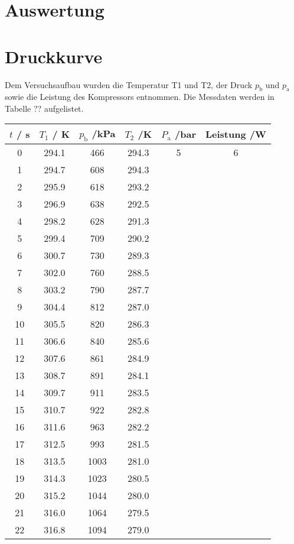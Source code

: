 \section{Auswertung}
\label{sec:Auswertung}
\section{Druckkurve}
Dem Versuchsaufbau wurden die Temperatur T1 und T2, der Druck $p_{\text{b}}$ und $p_{\text{a}}$ sowie die Leistung des Kompressors entnommen. Die Messdaten werden in Tabelle ?? aufgelistet.
\begin{table}
  \centering
  \begin{tabular}{c c c c c c}
    \toprule
    $t$ / s & $T_{\text{1}}$ / K & $p_{\text{b}}$ /kPa & $T_{2}$ /K & $P_{\text{a}}$ /bar & 
    Leistung /W \\
    \midrule
    0 	& 294.1 & 466	& 294.3	&5	&6 \\
    1 	& 294.7 & 608	& 294.3	&	&	\\
    2 	& 295.9 & 618	& 293.2	&	&	\\
    3 	& 296.9 & 638	& 292.5	&	&	\\
    4	& 298.2	& 628	& 291.3	&	&	\\
    5	& 299.4 & 709	& 290.2	&	&	\\
    6	& 300.7 & 730	& 289.3	&	&	\\
    7	& 302.0 & 760	& 288.5	&	&	\\
    8	& 303.2	& 790	& 287.7	&	&	\\
    9	& 304.4 & 812	& 287.0	&	&	\\
    10	& 305.5 & 820	& 286.3	&	&	\\
    11 	& 306.6 & 840	& 285.6	&	&	\\
    12	& 307.6	& 861	& 284.9	&	&	\\	
    13	& 308.7 & 891	& 284.1	&	&	\\	
    14 	& 309.7 & 911	& 283.5	&	&	\\
    15 	& 310.7 & 922	& 282.8	&	&	\\
    16 	& 311.6	& 963	& 282.2	&	&	\\
    17	& 312.5	& 993	& 281.5	&	&	\\
    18	& 313.5	& 1003	& 281.0	&	&	\\
    19	& 314.3	& 1023	& 280.5	&	&	\\
    20	& 315.2	& 1044	& 280.0	&	&	\\
    21	& 316.0	& 1064	& 279.5	&	&	\\
    22	& 316.8	& 1094	& 279.0	&	&	\\

\end{tabular}
\end{table}

